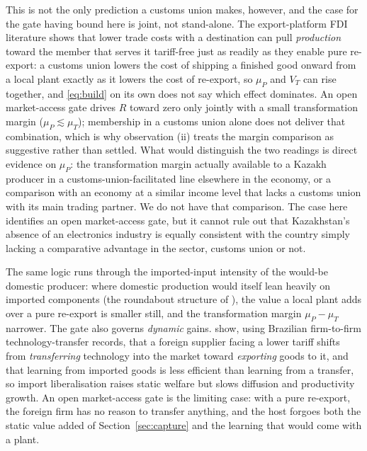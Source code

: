 \documentclass[12pt]{article}
\begin{document}
This is not the only prediction a customs union makes, however, and the case for the gate
having bound here is joint, not stand-alone. The export-platform FDI literature
\citep{brainard1997,helpmanmelitzyeaple2004,ekholmforslidmarkusen2007} shows that lower trade
costs with a destination can pull \emph{production} toward the member that serves it
tariff-free just as readily as they enable pure re-export: a customs union lowers the cost of
shipping a finished good onward from a local plant exactly as it lowers the cost of re-export,
so $\mu_P$ and $V_T$ can rise together, and \eqref{eq:build} on its own does not say which
effect dominates. An open market-access gate drives $R$ toward zero only jointly with a small
transformation margin ($\mu_P \lesssim \mu_T$); membership in a customs union alone does not
deliver that combination, which is why observation (ii) treats the margin comparison as
suggestive rather than settled. What would distinguish the two readings is direct evidence on
$\mu_P$: the transformation margin actually available to a Kazakh producer in a
customs-union-facilitated line elsewhere in the economy, or a comparison with an economy at a
similar income level that lacks a customs union with its main trading partner. We do not have
that comparison. The case here identifies an open market-access gate, but it cannot rule out
that Kazakhstan's absence of an electronics industry is equally consistent with the country
simply lacking a comparative advantage in the sector, customs union or not.

The same logic runs through the
imported-input intensity of the would-be domestic producer: where domestic production would
itself lean heavily on imported components (the roundabout structure of
\citet{gopinathneiman2014}), the value a local plant adds over a pure re-export is smaller
still, and the transformation margin $\mu_P - \mu_T$ narrower. The gate also governs
\emph{dynamic} gains. \citet{desouza2024diffusion} show, using Brazilian firm-to-firm
technology-transfer records, that a foreign supplier facing a lower tariff shifts from
\emph{transferring} technology into the market toward \emph{exporting} goods to it, and that
learning from imported goods is less efficient than learning from a transfer, so import
liberalisation raises static welfare but slows diffusion and productivity growth. An open
market-access gate is the limiting case: with a pure re-export, the foreign firm has no reason
to transfer anything, and the host forgoes both the static value added of
Section~\ref{sec:capture} and the learning that would come with a plant.
\end{document}
